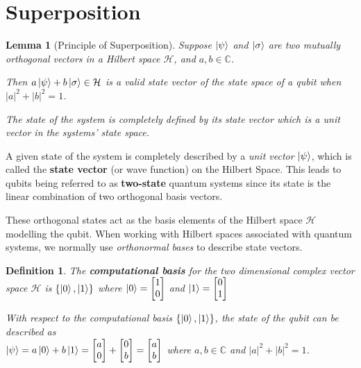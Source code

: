 \documentclass[12pt,twoside,fleqn]{report}
\theoremstyle{thmstyle}
\newtheorem{defn}{Definition}[chapter]
\newtheorem{lemma}{Lemma}[chapter]
\begin{document}
\pagebreak 
\section{Superposition}
\begin{mdframed}
\begin{lemma}[Principle of Superposition]

    Suppose $\ket{\psi}$ and $\ket{\sigma}$ are two mutually orthogonal vectors in a Hilbert space $\mathcal{H}$, and $a, b \in \mathbb{C}$. 

    Then $a \ket{\psi} + b \ket{\sigma} \in \mathcal{H}$ is a valid state vector of the state space of a qubit when $|a|^2 + |b|^2 = 1$. 

    The state of the system is completely defined by its state vector which is a unit vector in the systems' state space.
\end{lemma}
\end{mdframed}

A given state of the system is completely described by a \textit{unit vector} $\ket{\psi}$, which is called the \textbf{state vector} (or wave function) on the Hilbert Space. This leads to qubits being referred to as \textbf{two-state} quantum systems since its state is the linear combination of two orthogonal basis vectors. 

These orthogonal states act as the basis elements of the Hilbert space $\mathcal{H}$ modelling the qubit. When working with Hilbert spaces associated with quantum systems, we normally use \textit{orthonormal bases} to describe state vectors.

\begin{defn}
The \textbf{computational basis} for the two dimensional complex vector space $\mathcal{H}$ is $\{ \ket{0}, \ket{1} \}$ where $\ket{0} = \begin{bmatrix} 1 \\ 0 \end{bmatrix}$ and $\ket{1} = \begin{bmatrix} 0 \\ 1 \end{bmatrix}$

With respect to the computational basis $\{ \ket{0}, \ket{1} \}$, the state of the qubit can be described as \\ $\ket{\psi} = a \ket{0} + b \ket{1} = \begin{bmatrix} a \\ 0 \end{bmatrix} + \begin{bmatrix} 0 \\ b \end{bmatrix} = \begin{bmatrix} a \\ b \end{bmatrix} $ where $a, b \in \mathbb{C}$ and $|a|^2 + |b|^2 = 1$.

\end{defn}
\end{document}
